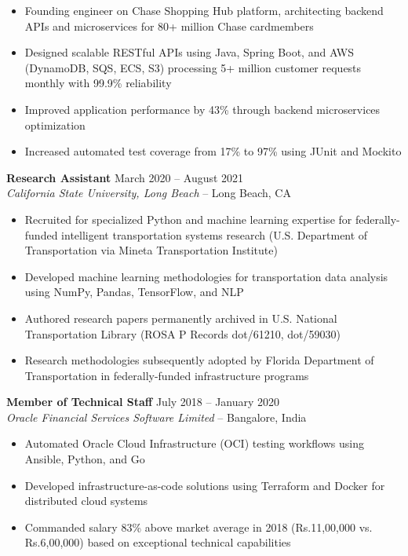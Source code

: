\documentclass[11pt,letterpaper]{article}
\begin{document}
\begin{itemize}
    \item Founding engineer on Chase Shopping Hub platform, architecting backend APIs and microservices for 80+ million Chase cardmembers
    \item Designed scalable RESTful APIs using Java, Spring Boot, and AWS (DynamoDB, SQS, ECS, S3) processing 5+ million customer requests monthly with 99.9\% reliability
    \item Improved application performance by 43\% through backend microservices optimization
    \item Increased automated test coverage from 17\% to 97\% using JUnit and Mockito
\end{itemize}

\textbf{Research Assistant} \hfill March 2020 -- August 2021\\
\textit{California State University, Long Beach} -- Long Beach, CA

\begin{itemize}
    \item Recruited for specialized Python and machine learning expertise for federally-funded intelligent transportation systems research (U.S. Department of Transportation via Mineta Transportation Institute)
    \item Developed machine learning methodologies for transportation data analysis using NumPy, Pandas, TensorFlow, and NLP
    \item Authored research papers permanently archived in U.S. National Transportation Library (ROSA P Records dot/61210, dot/59030)
    \item Research methodologies subsequently adopted by Florida Department of Transportation in federally-funded infrastructure programs
\end{itemize}

\textbf{Member of Technical Staff} \hfill July 2018 -- January 2020\\
\textit{Oracle Financial Services Software Limited} -- Bangalore, India

\begin{itemize}
    \item Automated Oracle Cloud Infrastructure (OCI) testing workflows using Ansible, Python, and Go
    \item Developed infrastructure-as-code solutions using Terraform and Docker for distributed cloud systems
    \item Commanded salary 83\% above market average in 2018 (Rs.11,00,000 vs. Rs.6,00,000) based on exceptional technical capabilities
\end{itemize}
\end{document}
